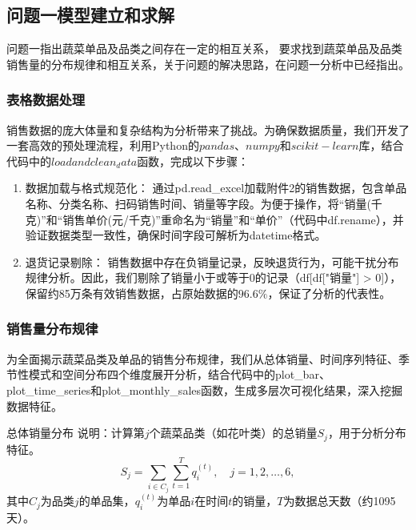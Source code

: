 \documentclass{cumcmthesis} %
\begin{document}
\subsection{问题一模型建立和求解}
问题一指出蔬菜单品及品类之间存在一定的相互关系，
要求找到蔬菜单品及品类销售量的分布规律和相互关系，关于问题的解决思路，在问题一分析中已经指出。

\subsubsection{表格数据处理}
销售数据的庞大体量和复杂结构为分析带来了挑战。为确保数据质量，我们开发了一套高效的预处理流程，利用Python的$pandas$、$numpy$和$scikit-learn$库，结合代码中的$loadandclean_data$函数，完成以下步骤：

\begin{enumerate}
    \item 数据加载与格式规范化：
    通过pd.read\_excel加载附件2的销售数据，包含单品名称、分类名称、扫码销售时间、销量等字段。为便于操作，将“销量(千克)”和“销售单价(元/千克)”重命名为“销量”和“单价”（代码中df.rename），并验证数据类型一致性，确保时间字段可解析为datetime格式。
    \item 退货记录剔除：
    销售数据中存在负销量记录，反映退货行为，可能干扰分布规律分析。因此，我们剔除了销量小于或等于0的记录（df[df["销量"] > 0]），保留约85万条有效销售数据，占原始数据的$96.6\%$，保证了分析的代表性。
\end{enumerate}

\subsubsection{销售量分布规律}
为全面揭示蔬菜品类及单品的销售分布规律，我们从总体销量、时间序列特征、季节性模式和空间分布四个维度展开分析，结合代码中的plot\_bar、plot\_time\_series和plot\_monthly\_sales函数，生成多层次可视化结果，深入挖掘数据特征。

总体销量分布
说明：计算第$j$个蔬菜品类（如花叶类）的总销量$S_j$，用于分析分布特征。
\begin{equation}
S_j = \sum_{i \in C_j} \sum_{t=1}^T q_i^{(t)}, \quad j=1,2,\dots,6,
\end{equation}
其中$C_j$为品类$j$的单品集，$q_i^{(t)}$为单品$i$在时间$t$的销量，$T$为数据总天数（约1095天）。
\end{document}
